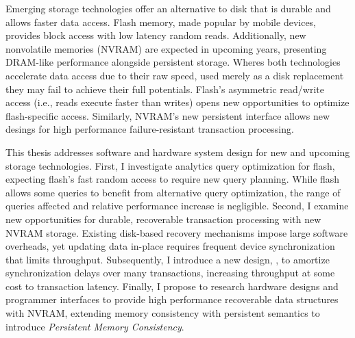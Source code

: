 Emerging storage technologies offer an alternative to disk that is durable and allows faster data access.
Flash memory, made popular by mobile devices, provides block access with low latency random reads.
Additionally, new nonvolatile memories (NVRAM) are expected in upcoming years, presenting DRAM-like performance alongside persistent storage.
Wheres both technologies accelerate data access due to their raw speed, used merely as a disk replacement they may fail to achieve their full potentials.
Flash's asymmetric read/write access (i.e., reads execute faster than writes) opens new opportunities to optimize flash-specific access.
Similarly, NVRAM's new persistent interface allows new desings for high performance failure-resistant transaction processing.

This thesis addresses software and hardware system design for new and upcoming storage technologies.
First, I investigate analytics query optimization for flash, expecting flash's fast random access to require new query planning.
While flash allows some queries to benefit from alternative query optimization, the range of queries affected and relative performance increase is negligible.
Second, I examine new opportunities for durable, recoverable transaction processing with new NVRAM storage.
Existing disk-based recovery mechanisms impose large software overheads, yet updating data in-place requires frequent device synchronization that limits throughput.
Subsequently, I introduce a new design, \GroupCommit, to amortize synchronization delays over many transactions, increasing throughput at some cost to transaction latency.
Finally, I propose to research hardware designs and programmer interfaces to provide high performance recoverable data structures with NVRAM, extending memory consistency with persistent semantics to introduce \emph{Persistent Memory Consistency}.
